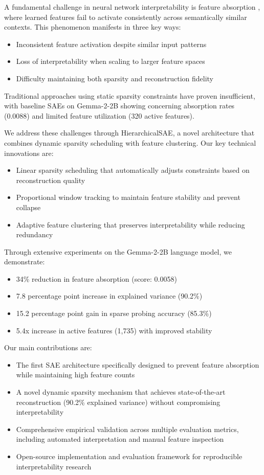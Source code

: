 \documentclass{article} %
\begin{document}
A fundamental challenge in neural network interpretability is feature absorption \cite{chaninAbsorptionStudyingFeature2024}, where learned features fail to activate consistently across semantically similar contexts. This phenomenon manifests in three key ways:
\begin{itemize}
    \item Inconsistent feature activation despite similar input patterns
    \item Loss of interpretability when scaling to larger feature spaces
    \item Difficulty maintaining both sparsity and reconstruction fidelity
\end{itemize}
Traditional approaches using static sparsity constraints have proven insufficient, with baseline SAEs on Gemma-2-2B showing concerning absorption rates (0.0088) and limited feature utilization (320 active features).

We address these challenges through HierarchicalSAE, a novel architecture that combines dynamic sparsity scheduling with feature clustering. Our key technical innovations are:
\begin{itemize}
    \item Linear sparsity scheduling that automatically adjusts constraints based on reconstruction quality
    \item Proportional window tracking to maintain feature stability and prevent collapse
    \item Adaptive feature clustering that preserves interpretability while reducing redundancy
\end{itemize}

Through extensive experiments on the Gemma-2-2B language model, we demonstrate:
\begin{itemize}
    \item 34\% reduction in feature absorption (score: 0.0058)
    \item 7.8 percentage point increase in explained variance (90.2\%)
    \item 15.2 percentage point gain in sparse probing accuracy (85.3\%)
    \item 5.4x increase in active features (1,735) with improved stability
\end{itemize}

Our main contributions are:
\begin{itemize}
    \item The first SAE architecture specifically designed to prevent feature absorption while maintaining high feature counts
    \item A novel dynamic sparsity mechanism that achieves state-of-the-art reconstruction (90.2\% explained variance) without compromising interpretability
    \item Comprehensive empirical validation across multiple evaluation metrics, including automated interpretation and manual feature inspection
    \item Open-source implementation and evaluation framework for reproducible interpretability research
\end{itemize}
\end{document}

